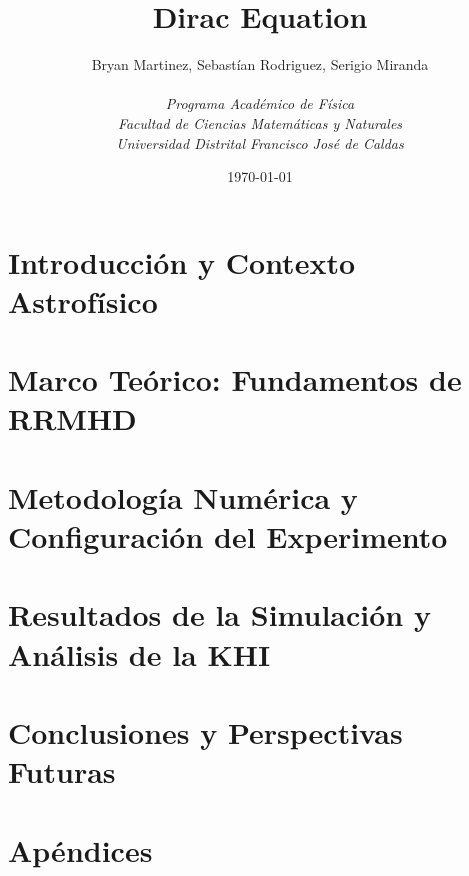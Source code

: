 \documentclass[11pt, english]{book}
\title{Dirac Equation}
\author{Bryan Martinez, Sebastían Rodriguez, Serigio Miranda \\ \ \\
  \textit{Programa Académico de Física} \\
  \textit{Facultad de Ciencias Matemáticas y Naturales} \\
  \textit{Universidad Distrital Francisco José de Caldas}
}
\date{\today}
\begin{document}
\frontmatter
\maketitle
\tableofcontents

\mainmatter







\chapter{Introducción y Contexto Astrofísico}
\label{ch:intro}


\chapter{Marco Teórico: Fundamentos de RRMHD}
\label{ch:rrmhd_theory}


\chapter{Metodología Numérica y Configuración del Experimento}
\label{ch:numerical_methods}


\chapter{Resultados de la Simulación y Análisis de la KHI}
\label{ch:results_discussion}


\chapter{Conclusiones y Perspectivas Futuras}
\label{ch:conclusions}


\appendix
\chapter{Apéndices}













\backmatter

\nocite{*} %
\printbibliography %
\end{document}
